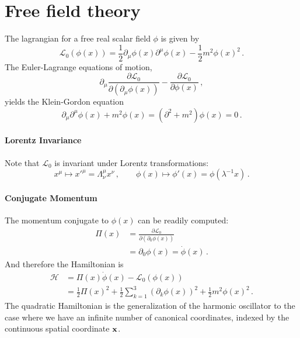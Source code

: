 \newcommand{\tphi}{\tilde{\phi}}
\newcommand{\tj}{\tilde{J}}
\newcommand{\tchi}{\tilde{\chi}}

\section{Free field theory}
\label{sec:real-scalar-field}

The lagrangian for a free real scalar field $\phi$ is given by
\begin{equation}
  \label{eq:RealScalLagr}
  \mathcal{L}_0\left(\phi(x)\right)=
  \frac12 \partial_\mu \phi(x) \partial^\mu \phi(x) - 
  \frac12 m^2 \phi(x)^2\, .
\end{equation}
The Euler-Lagrange equations of motion, 
\begin{equation}
  \label{eq:EulerLagrange}
  \partial_\mu \frac{\partial \mathcal{L}_0}{\partial\left(\partial_\mu \phi(x)\right)} 
  - \frac{\partial \mathcal{L}_0}{\partial \phi(x)}\, ,
\end{equation}
yields the Klein-Gordon equation
\begin{equation}
  \label{eq:KleinGordonScal}
  \partial_\mu \partial^\mu \phi(x) + m^2 \phi(x) = \left( \partial^2 + m^2 \right) \phi(x) = 0\, . 
\end{equation}

\paragraph{Lorentz Invariance}

Note that $\mathcal{L}_0$ is invariant under Lorentz transformations:
\begin{equation}
  \label{eq:LorentzTransfScal}
  x^\mu \mapsto x'^\mu =  \Lambda^\mu_\nu x^\nu\, , \quad \quad 
  \phi(x) \mapsto \phi'(x) = \phi(\lambda^{-1}x)\, .
\end{equation}

\paragraph{Conjugate Momentum} 

The momentum conjugate to $\phi(x)$ can be readily computed:
\begin{align}
  \label{eq:ScalMom}
  \Pi(x) &= \frac{\partial \mathcal{L}_0}{\partial (\partial_0\phi(x))} \\
  &= \partial_0 \phi(x) = \dot{\phi}(x)\, .
\end{align}
And therefore the Hamiltonian is 
\begin{align}
  \mathcal{H} &= \Pi(x) \dot{\phi}(x) - \mathcal{L}_0\left(\phi(x)\right) \\
  &= \frac12 \Pi(x)^2 + \frac12 \sum_{k=1}^3 \left(\partial_k \phi(x)\right)^2
    + \frac12 m^2 \phi(x)^2\, .
\end{align}
The quadratic Hamiltonian is the generalization of the harmonic oscillator to the case where we have an infinite number of canonical coordinates, indexed by the continuous spatial coordinate ${\mathbf x}$. 

